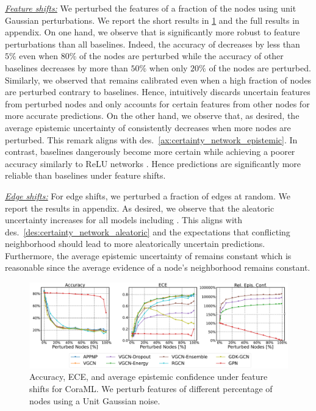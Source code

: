 \textit{\underline{Feature shifts:}} We perturbed the features of a fraction of the nodes using unit Gaussian perturbations. We report the short results in \cref{fig:shifts-normal-cora} and the full results in appendix. On one hand, we observe that \GPNacro{} is significantly more robust to feature perturbations than all baselines. Indeed, the accuracy of \GPNacro{} decreases by less than $5\%$ even when $80\%$ of the nodes are perturbed while the accuracy of other baselines decreases by more than $50\%$ when only $20\%$ of the nodes are perturbed. Similarly, we observed that \GPNacro{} remains calibrated even when a high fraction of nodes are perturbed contrary to baselines. Hence, \GPNacro{} intuitively discards uncertain features from perturbed nodes and only accounts for certain features from other nodes for more accurate predictions. On the other hand, we observe that, as desired, the average epistemic uncertainty of \GPNacro{} consistently decreases when more nodes are perturbed. This remark aligns with des.~\ref{ax:certainty_network_epistemic}. In contrast, baselines dangerously become more certain while achieving a poorer accuracy similarly to ReLU networks \citep{overconfident-relu}. Hence \GPNacro{} predictions are significantly more reliable than baselines under feature shifts. 


\textit{\underline{Edge shifts:}} For edge shifts, we perturbed a fraction of edges at random. We report the results in appendix. As desired, we observe that the aleatoric uncertainty increases for all models including \GPNacro{}. This aligns with des.~\ref{des:certainty_network_aleatoric} and the expectations that conflicting neighborhood should lead to more aleatorically uncertain predictions. Furthermore, the average epistemic uncertainty of \GPNacro{} remains constant which is reasonable since the average evidence of a node's neighborhood remains constant.

%
\begin{figure}[!h]
    \centering
    \includegraphics[width=\textwidth]{sections/009_neurips2021/resources/CoraML-normal-shift.pdf}
    \caption{Accuracy, ECE, and average epistemic confidence under feature shifts for CoraML. We perturb features of different percentage of nodes using a Unit Gaussian noise.}
    \label{fig:shifts-normal-cora}
\end{figure}
%

